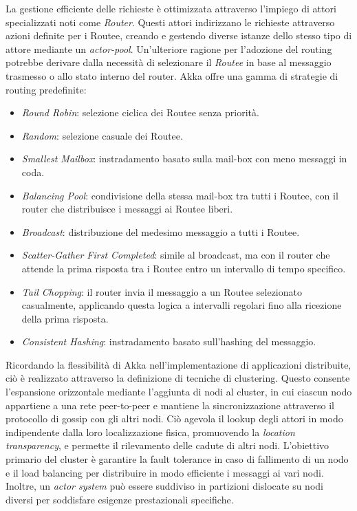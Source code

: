La gestione efficiente delle richieste è ottimizzata attraverso l'impiego di attori specializzati noti come \textit{Router}.
Questi attori indirizzano le richieste attraverso azioni definite per i Routee, creando e gestendo diverse istanze dello stesso tipo di attore mediante un \textit{actor-pool}.
Un'ulteriore ragione per l'adozione del routing potrebbe derivare dalla necessità di selezionare il \textit{Routee} in base al messaggio trasmesso o allo stato interno del router.
Akka offre una gamma di strategie di routing predefinite:
\begin{itemize}
  \item \textit{Round Robin}: selezione ciclica dei Routee senza priorità.
  \item \textit{Random}: selezione casuale dei Routee.
  \item \textit{Smallest Mailbox}: instradamento basato sulla mail-box con meno messaggi in coda.
  \item \textit{Balancing Pool}: condivisione della stessa mail-box tra tutti i Routee, con il router che distribuisce i messaggi ai Routee liberi.
  \item \textit{Broadcast}: distribuzione del medesimo messaggio a tutti i Routee.
  \item \textit{Scatter-Gather First Completed}: simile al broadcast, ma con il router che attende la prima risposta tra i Routee entro un intervallo di tempo specifico.
  \item \textit{Tail Chopping}: il router invia il messaggio a un Routee selezionato casualmente, applicando questa logica a intervalli regolari fino alla ricezione della prima risposta.
  \item \textit{Consistent Hashing}: instradamento basato sull'hashing del messaggio.
\end{itemize}
Ricordando la flessibilità di Akka nell'implementazione di applicazioni distribuite, ciò è realizzato attraverso la definizione di tecniche di clustering.
Questo consente l'espansione orizzontale mediante l'aggiunta di nodi al cluster, in cui ciascun nodo appartiene a una rete peer-to-peer e mantiene la sincronizzazione attraverso il protocollo di gossip con gli altri nodi.
Ciò agevola il lookup degli attori in modo indipendente dalla loro localizzazione fisica, promuovendo la \textit{location transparency}, e permette il rilevamento delle cadute di altri nodi.
L'obiettivo primario del cluster è garantire la fault tolerance in caso di fallimento di un nodo e il load balancing per distribuire in modo efficiente i messaggi ai vari nodi.
Inoltre, un \textit{actor system} può essere suddiviso in partizioni dislocate su nodi diversi per soddisfare esigenze prestazionali specifiche.

